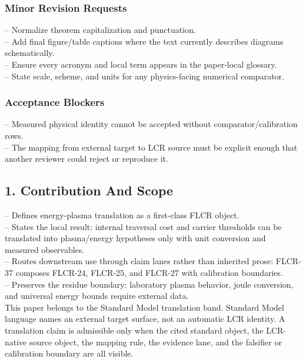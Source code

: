 \documentclass[11pt]{article}
\begin{document}
\subsubsection*{Minor Revision Requests}

\noindent{}-- Normalize theorem capitalization and punctuation.\\
\noindent{}-- Add final figure/table captions where the text currently describes diagrams schematically.\\
\noindent{}-- Ensure every acronym and local term appears in the paper-local glossary.\\
\noindent{}-- State scale, scheme, and units for any physics-facing numerical comparator.\\

\subsubsection*{Acceptance Blockers}

\noindent{}-- Measured physical identity cannot be accepted without comparator/calibration rows.\\
\noindent{}-- The mapping from external target to LCR source must be explicit enough that another reviewer could reject or reproduce it.\\


\subsection*{1. Contribution And Scope}

\noindent{}-- Defines energy-plasma translation as a first-class FLCR object.\\
\noindent{}-- States the local result: internal traversal cost and carrier thresholds can be translated into plasma/energy hypotheses only with unit conversion and measured observables.\\
\noindent{}-- Routes downstream use through claim lanes rather than inherited prose: FLCR-37 composes FLCR-24, FLCR-25, and FLCR-27 with calibration boundaries.\\
\noindent{}-- Preserves the residue boundary: laboratory plasma behavior, joule conversion, and universal energy bounds require external data.\\

This paper belongs to the Standard Model translation band. Standard Model language names an external target surface, not an automatic LCR identity. A translation claim is admissible only when the cited standard object, the LCR-native source object, the mapping rule, the evidence lane, and the falsifier or calibration boundary are all visible.
\end{document}
